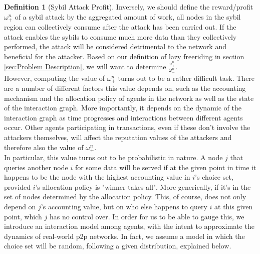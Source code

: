 \documentclass[11pt,a4paper]{report}
\theoremstyle{definition}
\newtheorem{definition}{Definition}[section]
\theoremstyle{theorem}
\theoremstyle{proposition}
\theoremstyle{corollary}
\theoremstyle{lemma}
\theoremstyle{example}
\theoremstyle{remark}
\begin{document}
\begin{definition}[Sybil Attack Profit]
\noindent{}Inversely, we should define the reward/profit $\omega_{+}^{n}$ of a sybil attack by the aggregated amount of work, all nodes in the sybil region can collectively consume after the attack has been carried out. If the attack enables the sybils to consume much more data than they collectively performed, the attack will be considered detrimental to the network and beneficial for the attacker. Based on our definition of lazy freeriding in section \ref{sec:Problem Description}, we will want to determine $\frac{\omega_{+}^{n}}{\omega_{-}^{n}}$. \vspace{1em}\\

\noindent{}However, computing the value of $\omega_{+}^{n}$ turns out to be a rather difficult task. There are a number of different factors this value depends on, such as the accounting mechanism and the allocation policy of agents in the network as well as the state of the interaction graph. More importantly, it depends on the dynamic of the interaction graph as time progresses and interactions between different agents occur. Other agents participating in transactions, even if these don't involve the attackers themselves, will affect the reputation values of the attackers and therefore also the value of $\omega_{+}^{n}$. \vspace{1em}\\

\noindent{}In particular, this value turns out to be probabilistic in nature. A node $j$ that queries another node $i$ for some data will be served if at the given point in time it happens to be the node with the highest accounting value in $i$'s choice set, provided $i$'s allocation policy is "winner-takes-all". More generically, if it's in the set of nodes determined by the allocation policy. This, of course, does not only depend on $j$'s accounting value, but on who else happens to query $i$ at this given point, which $j$ has no control over. In order for us to be able to gauge this, we introduce an interaction model among agents, with the intent to approximate the dynamics of real-world p2p networks. In fact, we assume a model in which the choice set will be random, following a given distribution, explained below.  \vspace{1em}\\ 


\end{definition}
\end{document}
